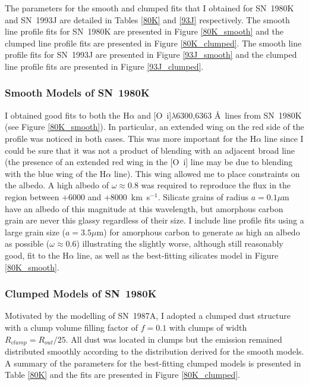 The parameters for the smooth and clumped fits  that I obtained for SN~1980K and SN~1993J are detailed in Tables \ref{80K} and \ref{93J} respectively. The smooth line profile fits for SN~1980K are presented in Figure \ref{80K_smooth} and the clumped line profile fits are presented in Figure \ref{80K_clumped}.  The smooth line profile fits for SN~1993J are presented in Figure \ref{93J_smooth} and the clumped line profile fits are presented in Figure \ref{93J_clumped}.  


\subsubsection{Smooth Models of SN~1980K}

I obtained good fits to both the H$\alpha$ and [O~{\sc i}]$\lambda$6300,6363 \AA\  lines from SN~1980K (see Figure \ref{80K_smooth}).  In particular, an extended wing on the red side of the profile was noticed in both cases. This was more important for the H$\alpha$ line since I could be sure that it was not a product of blending with an adjacent broad line (the presence of an extended red wing in the [O~{\sc i}] line may be due to blending with the blue wing of the H$\alpha$ line).  This wing allowed me to place constraints on the albedo.  A high albedo of $\omega\approx0.8$  was required to reproduce the flux in the region between $+6000$ and $+8000$~km~s$^{-1}$.  Silicate grains of radius $a=0.1\mu$m have an albedo of this magnitude at this wavelength, but amorphous carbon grain are never this glassy regardless of their size.  I include line profile fits using a large grain size ($a=3.5\mu$m) for amorphous carbon to generate as high an albedo as possible ($\omega\approx0.6$) illustrating the slightly worse, although still reasonably good, fit to the H$\alpha$ line, as well as the best-fitting silicates model in Figure \ref{80K_smooth}.  

\subsubsection{Clumped Models of SN~1980K}

Motivated by the modelling of SN~1987A, I adopted a clumped dust structure with a clump volume filling factor of $f=0.1$ with clumps of width $R_{clump}=R_{out}/25$.  All dust was located in clumps but the emission remained distributed smoothly according to the distribution derived for the smooth models.  A summary of the parameters for the best-fitting clumped models is presented in Table \ref{80K} and the fits are presented in Figure \ref{80K_clumped}.

